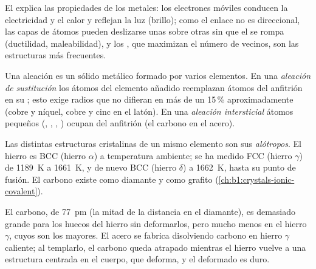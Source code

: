 \begin{proposition}\label{prop:b1:crystals-metals:properties}
El  explica las propiedades de los metales: los electrones
móviles conducen la electricidad y el calor y reflejan la luz (brillo);
como el enlace no es direccional, las capas de átomos pueden deslizarse
unas sobre otras sin que el  se rompa (ductilidad, maleabilidad),
y los , que maximizan el número de vecinos, son
las estructuras más frecuentes.
\end{proposition}
\admitted

\begin{definition}[Aleaciones]\label{def:b1:crystals-metals:alloy}
Una aleación es un sólido metálico formado por varios elementos. En una
\emph{aleación de sustitución} los átomos del elemento
añadido reemplazan átomos del anfitrión en su ; esto exige radios que
no difieran en más de un 15\,\% aproximadamente (cobre y níquel, cobre y
cinc en el latón). En una \emph{aleación intersticial}
átomos pequeños (, , , ) ocupan  del anfitrión (el carbono en el acero).
\end{definition}

\begin{definition}[Alotropía]\label{def:b1:crystals-metals:allotropy}
Las distintas estructuras cristalinas de un mismo elemento son sus
\emph{alótropos}. El hierro es BCC (hierro $\alpha$) a
temperatura ambiente; se ha medido FCC (hierro $\gamma$) de
\qty{1189}{K} a \qty{1661}{K}, y de nuevo BCC (hierro $\delta$) a
\qty{1662}{K}, hasta su punto de fusión. El carbono existe como diamante y
como grafito
(\cref{ch:b1:crystals-ionic-covalent}).
\end{definition}

\begin{example}[El acero]\label{ex:b1:crystals-metals:steel}
El carbono, de  \qty{77}{pm} (la mitad de la distancia
 en el diamante), es demasiado grande para los huecos del hierro
sin deformarlos, pero mucho menos en el hierro $\gamma$, cuyos  son los mayores. El acero se fabrica disolviendo carbono en
hierro $\gamma$ caliente; al templarlo, el carbono queda atrapado
mientras el hierro vuelve a una estructura centrada en el cuerpo, que
deforma, y el  deformado es duro.
\end{example}

